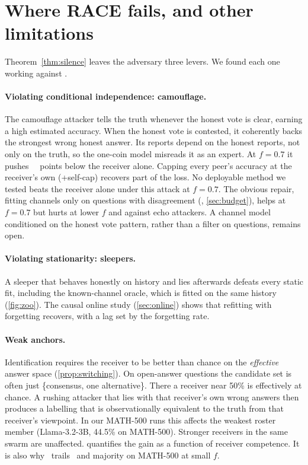 \section{Where RACE fails, and other limitations}\label{sec:limits}

Theorem~\ref{thm:silence} leaves the adversary three levers. We found each one working against \race.

\paragraph{Violating conditional independence: camouflage.} The camouflage attacker tells the truth whenever the honest vote is clear, earning a high estimated accuracy. When the honest vote is contested, it coherently backs the strongest wrong honest answer. Its reports depend on the honest reports, not only on the truth, so the one-coin model misreads it as an expert. At $f=0.7$ it pushes \race\ \zooCamoRaceGap\ points below the receiver alone. Capping every peer's accuracy at the receiver's own (\race+self-cap) recovers part of the loss. No deployable method we tested beats the receiver alone under this attack at $f=0.7$. The obvious repair, fitting channels only on questions with disagreement (\raceD, \cref{sec:budget}), helps at $f=0.7$ but hurts at lower $f$ and against echo attackers. A channel model conditioned on the honest vote pattern, rather than a filter on questions, remains open.

\paragraph{Violating stationarity: sleepers.} A sleeper that behaves honestly on history and lies afterwards defeats every static fit, including the known-channel oracle, which is fitted on the same history (\cref{fig:zoo}). The causal online study (\cref{sec:online}) shows that refitting with forgetting recovers, with a lag set by the forgetting rate.

\paragraph{Weak anchors.} Identification requires the receiver to be better than chance on the \emph{effective} answer space (\cref{prop:switching}). On open-answer questions the candidate set is often just \{consensus, one alternative\}. There a receiver near 50\% is effectively at chance. A rushing attacker that lies with that receiver's own wrong answers then produces a labelling that is observationally equivalent to the truth from that receiver's viewpoint. In our MATH-500 runs this affects the weakest roster member (Llama-3.2-3B, 44.5\% on MATH-500). Stronger receivers in the same swarm are unaffected.  quantifies the gain as a function of receiver competence. It is also why \race\ trails \aip\ and majority on MATH-500 at small $f$.

